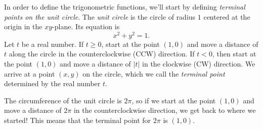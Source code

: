 \documentclass[letterpaper,12pt,oneside]{book}
\theoremstyle{definition}
\begin{document}
{\noindent
In order to define the trigonometric functions, we'll start by defining \emph{terminal points on the unit circle}.  The \emph{unit circle} is the circle of radius $1$ centered at the origin in the $xy$-plane.  Its equation is
\[
x^2+y^2=1.
\]
Let $t$ be a real number.  If $t\geq 0$, start at the point $(1,0)$ and move a distance of $t$ along the circle in the counterclockwise (CCW) direction.  If $t<0$, then start at the point $(1,0)$ and move a distance of $|t|$ in the clockwise (CW) direction.  We arrive at a point $(x,y)$ on the circle, which we call the \emph{terminal point} determined by the real number $t$.

The circumference of the unit circle is
$2\pi$, so if we start at the point $(1,0)$ and move a distance of $2\pi$ in the counterclockwise direction, we get back to where we started!  This means that the terminal point for $2\pi$ is $(1,0)$.

}
\end{document}

